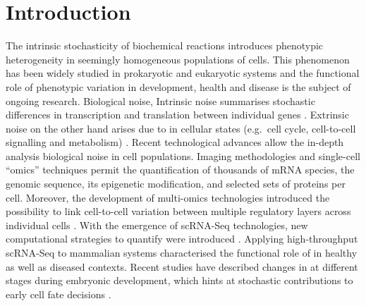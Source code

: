 
\chapter{Introduction}  

\vspace{-1cm}

\graphicspath{{"Figs/Introduction/"}}

\begin{Abstract}
\hspace{-5mm} The intrinsic stochasticity of biochemical reactions introduces phenotypic heterogeneity in seemingly homogeneous populations of cells. 
This phenomenon has been widely studied in prokaryotic and eukaryotic systems and the functional role of phenotypic variation in development, health and disease is the subject of ongoing research. 
Biological noise, 
Intrinsic noise summarises stochastic differences in transcription and translation between individual genes \citep{Elowitz2002, Raser2004, Sanchez2013}. 
Extrinsic noise on the other hand arises due to  in cellular states (e.g.~cell cycle, cell-to-cell signalling and metabolism)  \citep{Zopf2013, Iwamoto2016, Kiviet2014}. 
Recent technological advances allow the in-depth analysis  biological noise in cell populations. 
Imaging methodologies \citep{Chen2015} and single-cell “omics” techniques \citep{Bock2016} permit the quantification of thousands of mRNA species, the genomic sequence, its epigenetic modification, and selected sets of proteins per cell. 
Moreover, the development of multi-omics technologies introduced the possibility to link cell-to-cell variation between multiple regulatory layers across individual cells \citep{Macaulay2017}. 
With the emergence of \gls{scRNA-Seq} technologies, new computational strategies to quantify  were introduced \cite{Brennecke2013, Vallejos2015BASiCS, Kolodziejczyk2015cell, Buettner2015, Fan2016, Richard2016}. 
Applying high-throughput scRNA-Seq to mammalian systems characterised the functional role of  in healthy as well as diseased contexts. 
Recent studies have described changes in  at different stages during embryonic development, which hints at stochastic contributions to early cell fate decisions \citep{Goolam2016, Mohammed2017, Ohnishi2014}. 

\end{Abstract}
